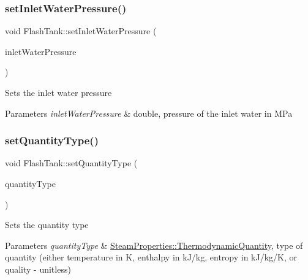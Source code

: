 \subsubsection{\texorpdfstring{set\+Inlet\+Water\+Pressure()}{setInletWaterPressure()}\hspace{0.1cm}{\footnotesize\ttfamily [3/3]}}
{\footnotesize\ttfamily void Flash\+Tank\+::set\+Inlet\+Water\+Pressure (\begin{DoxyParamCaption}\item[{double}]{inlet\+Water\+Pressure }\end{DoxyParamCaption})}

Sets the inlet water pressure 
\begin{DoxyParams}{Parameters}
{\em inlet\+Water\+Pressure} & double, pressure of the inlet water in M\+Pa \\
\hline
\end{DoxyParams}
\mbox{\label{class_flash_tank_a30aa7a42d1547f61b176da4a15e8e8ee}} 
\subsubsection{\texorpdfstring{set\+Quantity\+Type()}{setQuantityType()}\hspace{0.1cm}{\footnotesize\ttfamily [1/3]}}
{\footnotesize\ttfamily void Flash\+Tank\+::set\+Quantity\+Type (\begin{DoxyParamCaption}\item[{\hyperlink{class_steam_properties_ae0294bedf7d178c2d8fb6aed0f62fbff}{Steam\+Properties\+::\+Thermodynamic\+Quantity}}]{quantity\+Type }\end{DoxyParamCaption})}

Sets the quantity type 
\begin{DoxyParams}{Parameters}
{\em quantity\+Type} & \hyperlink{class_steam_properties_ae0294bedf7d178c2d8fb6aed0f62fbff}{Steam\+Properties\+::\+Thermodynamic\+Quantity}, type of quantity (either temperature in K, enthalpy in k\+J/kg, entropy in k\+J/kg/K, or quality -\/ unitless) \\
\hline
\end{DoxyParams}
\mbox{\label{class_flash_tank_a30aa7a42d1547f61b176da4a15e8e8ee}} 
